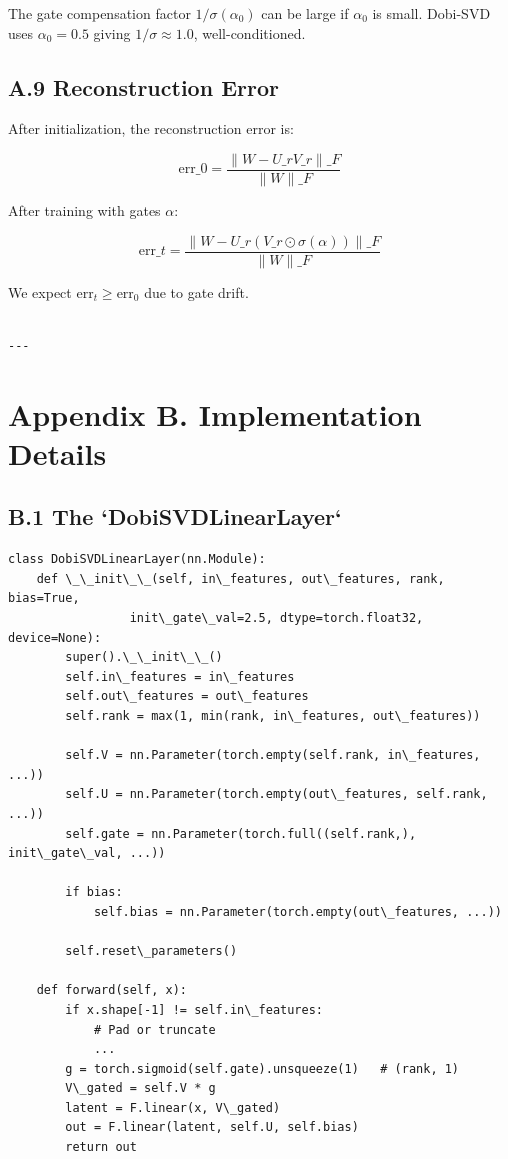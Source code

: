 The gate compensation factor $1/\sigma(\alpha_0)$ can be large if 
$\alpha_0$ is small. Dobi-SVD uses $\alpha_0 = 0.5$ giving 
$1/\sigma \approx 1.0$, well-conditioned.

\subsection{A.9 Reconstruction Error}

After initialization, the reconstruction error is:

\[
\text{err}\_0 = \frac{\|W - U\_r V\_r\|\_F}{\|W\|\_F}
\tag{A.8}
\]

After training with gates $\alpha$:

\[
\text{err}\_t = \frac{\|W - U\_r (V\_r \odot \sigma(\alpha))\|\_F}{\|W\|\_F}
\tag{A.9}
\]

We expect $\text{err}_t \geq \text{err}_0$ due to gate drift.
\begin{lstlisting}

---
\end{lstlisting}


\section{Appendix B. Implementation Details}

\subsection{B.1 The `DobiSVDLinearLayer`}

\begin{lstlisting}
class DobiSVDLinearLayer(nn.Module):
    def \_\_init\_\_(self, in\_features, out\_features, rank, bias=True,
                 init\_gate\_val=2.5, dtype=torch.float32, device=None):
        super().\_\_init\_\_()
        self.in\_features = in\_features
        self.out\_features = out\_features
        self.rank = max(1, min(rank, in\_features, out\_features))
        
        self.V = nn.Parameter(torch.empty(self.rank, in\_features, ...))
        self.U = nn.Parameter(torch.empty(out\_features, self.rank, ...))
        self.gate = nn.Parameter(torch.full((self.rank,), init\_gate\_val, ...))
        
        if bias:
            self.bias = nn.Parameter(torch.empty(out\_features, ...))
        
        self.reset\_parameters()
    
    def forward(self, x):
        if x.shape[-1] != self.in\_features:
            # Pad or truncate
            ...
        g = torch.sigmoid(self.gate).unsqueeze(1)   # (rank, 1)
        V\_gated = self.V * g
        latent = F.linear(x, V\_gated)
        out = F.linear(latent, self.U, self.bias)
        return out
\end{lstlisting}


